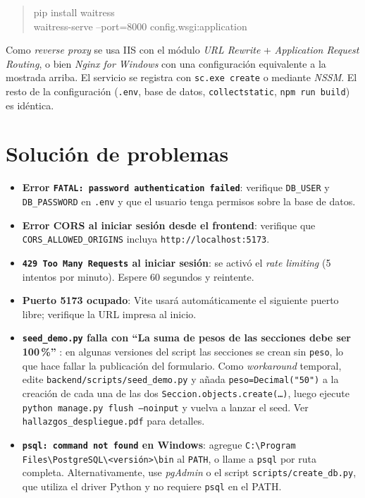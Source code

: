 \documentclass{computacion}
\begin{document}
\begin{quote}\ttfamily
pip install waitress \\
waitress-serve --port=8000 config.wsgi:application
\end{quote}

Como \emph{reverse proxy} se usa IIS con el módulo \emph{URL Rewrite} + \emph{Application Request Routing}, o bien \emph{Nginx for Windows} con una configuración equivalente a la mostrada arriba. El servicio se registra con \texttt{sc.exe create} o mediante \emph{NSSM}. El resto de la configuración (\texttt{.env}, base de datos, \texttt{collectstatic}, \texttt{npm run build}) es idéntica.

\section{Solución de problemas}

\begin{itemize}
    \item \textbf{Error \texttt{FATAL: password authentication failed}}: verifique \texttt{DB\_USER} y \texttt{DB\_PASSWORD} en \texttt{.env} y que el usuario tenga permisos sobre la base de datos.
    \item \textbf{Error CORS al iniciar sesión desde el frontend}: verifique que \texttt{CORS\_ALLOWED\_ORIGINS} incluya \texttt{http://localhost:5173}.
    \item \textbf{\texttt{429 Too Many Requests} al iniciar sesión}: se activó el \emph{rate limiting} (5 intentos por minuto). Espere 60 segundos y reintente.
    \item \textbf{Puerto 5173 ocupado}: Vite usará automáticamente el siguiente puerto libre; verifique la URL impresa al inicio.
    \item \textbf{\texttt{seed\_demo.py} falla con ``La suma de pesos de las secciones debe ser 100\,\%'' }: en algunas versiones del script las secciones se crean sin \texttt{peso}, lo que hace fallar la publicación del formulario. Como \emph{workaround} temporal, edite \texttt{backend/scripts/seed\_demo.py} y añada \texttt{peso=Decimal("50")} a la creación de cada una de las dos \texttt{Seccion.objects.create(\ldots)}, luego ejecute \texttt{python manage.py flush --noinput} y vuelva a lanzar el seed. Ver \texttt{hallazgos\_despliegue.pdf} para detalles.
    \item \textbf{\texttt{psql: command not found} en Windows}: agregue \texttt{C:\textbackslash Program Files\textbackslash PostgreSQL\textbackslash<versión>\textbackslash bin} al \texttt{PATH}, o llame a \texttt{psql} por ruta completa. Alternativamente, use \emph{pgAdmin} o el script \texttt{scripts/create\_db.py}, que utiliza el driver Python y no requiere \texttt{psql} en el PATH.
\end{itemize}
\end{document}
